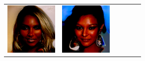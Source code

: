 \documentclass{article}
\newcommand{\pganw}{1.0in}
\begin{document}
\begin{table}[htbp]
\begin{center}
\begin{tabular}{cc|cc|cc}
\includegraphics[width=\pganw]{figures/pgan/14_base_raw_base.png} &
\includegraphics[width=\pganw]{figures/pgan/15_base_raw_base.png} &

\end{tabular}
\end{center}
\end{table}
\end{document}
